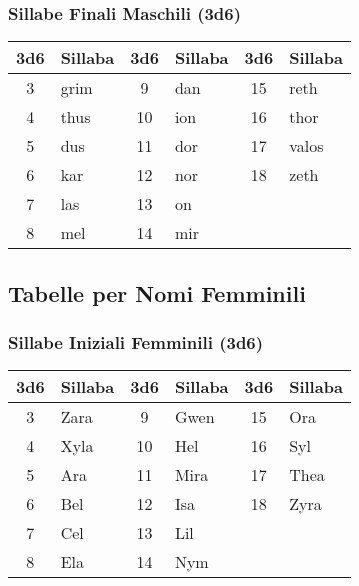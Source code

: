 \begin{multicols}{2}
{\begin{tabular}{c|l|c|l}
\end{tabular}


\subsubsection*{Sillabe Finali Maschili (3d6)}

\noindent\begin{tabular}{c|l|c|l|c|l}
	\toprule
\textbf{3d6} & \textbf{Sillaba} & \textbf{3d6} & \textbf{Sillaba} & \textbf{3d6} & \textbf{Sillaba} \\
\toprule
3 & grim & 9 & dan & 15 & reth \\
4 & thus & 10 & ion & 16 & thor \\
5 & dus & 11 & dor & 17 & valos \\
6 & kar & 12 & nor & 18 & zeth \\
7 & las & 13 & on & & \\
8 & mel & 14 & mir & & \\

\end{tabular}


\subsection*{Tabelle per Nomi Femminili}

\subsubsection*{Sillabe Iniziali Femminili (3d6)}

\noindent\begin{tabular}{c|l|c|l|c|l}
	\toprule
\textbf{3d6} & \textbf{Sillaba} & \textbf{3d6} & \textbf{Sillaba} & \textbf{3d6} & \textbf{Sillaba} \\
\toprule
3 & Zara & 9 & Gwen & 15 & Ora \\
4 & Xyla & 10 & Hel & 16 & Syl \\
5 & Ara & 11 & Mira & 17 & Thea \\
6 & Bel & 12 & Isa & 18 & Zyra \\
7 & Cel & 13 & Lil & & \\
8 & Ela & 14 & Nym & & \\

\end{tabular}

}
\end{multicols}
